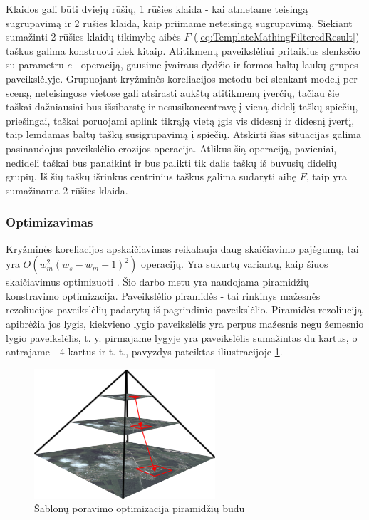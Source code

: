 \documentclass[a4paper,12pt]{article}
\begin{document}
			Klaidos gali būti dviejų rūšių, 1 rūšies klaida - kai atmetame teisingą sugrupavimą ir 2 rūšies klaida, kaip priimame neteisingą sugrupavimą.
			Siekiant sumažinti 2 rūšies klaidų tikimybę aibės $F$ (\ref{eq:TemplateMathingFilteredResult}) taškus galima konstruoti kiek kitaip. Atitikmenų paveikslėliui pritaikius slenksčio su parametru $c^-$ operaciją, gausime įvairaus dydžio ir formos baltų laukų grupes paveikslėlyje. Grupuojant kryžminės koreliacijos metodu bei slenkant modelį per sceną, neteisingose vietose gali atsirasti aukštų atitikmenų įverčių, tačiau šie taškai dažniausiai bus išsibarstę ir nesusikoncentravę į vieną didelį taškų spiečių, priešingai, taškai poruojami aplink tikrąją vietą įgis vis didesnį ir didesnį įvertį, taip lemdamas baltų taškų susigrupavimą į spiečių. Atskirti šias situacijas galima pasinaudojus paveikslėlio erozijos operacija. Atlikus šią operaciją, pavieniai, nedideli taškai bus panaikint ir bus palikti tik dalis taškų iš buvusių didelių grupių. Iš šių taškų išrinkus centrinius taškus galima sudaryti aibę $F$, taip yra sumažinama 2 rūšies klaida.
			
			\subsubsection{Optimizavimas}
			
			Kryžminės koreliacijos apskaičiavimas reikalauja daug skaičiavimo pajėgumų, tai yra $O(w_m^2(w_s-w_m+1)^2)$ operacijų. Yra sukurtų variantų, kaip šiuos skaičiavimus optimizuoti \cite{brunelli2008template}. Šio darbo metu yra naudojama piramidžių konstravimo optimizacija. Paveikslėlio piramidės - tai rinkinys mažesnės rezoliucijos paveikslėlių padarytų iš pagrindinio paveikslėlio. Piramidės rezoliuciją apibrėžia jos lygis, kiekvieno lygio paveikslėlis yra perpus mažesnis negu žemesnio lygio paveikslėlis, t. y. pirmajame lygyje yra paveikslėlis sumažintas du kartus, o antrajame - 4 kartus ir t. t., pavyzdys pateiktas iliustracijoje \ref{fig:PyramidTemplateMatching}.
			
			\begin{figure}[h]
				\centering
				\includegraphics[width=0.6\textwidth]{images/PyramidTemplateMatching.png}
				\caption{Šablonų poravimo optimizacija piramidžių būdu}
				\label{fig:PyramidTemplateMatching}
			\end{figure}	
			
\end{document}
